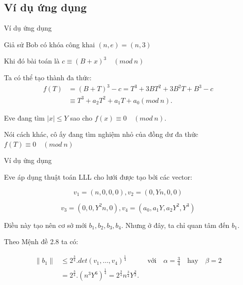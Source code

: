 \documentclass{beamer}
\numberwithin{equation}{section}
\begin{document}
\subsection{Ví dụ ứng dụng}
\begin{frame}{Ví dụ ứng dụng}


Giả sử Bob có khóa công khai $(n, e) = (n, 3)$

Khi đó bài toán là $c \equiv (B+x)^3 \quad (mod \ n)$ 


Ta có thể tạo thành đa thức:
$$
\begin{aligned}
f(T) & = (B+T)^3 - c = T^3 + 3BT^2 + 3B^2T + B^3 -c\\
& \equiv T^3 + a_2T^2 + a_1T + a_0 (mod \ n).
\end{aligned}
$$

Eve đang tìm $|x| \leq Y$ sao cho $f(x) \equiv 0 \quad (mod \ n)$. 

Nói cách khác, cô ấy đang tìm nghiệm nhỏ của đồng dư đa thức $f(T) \equiv 0 \quad (mod \ n)$



 


\end{frame}
\begin{frame}{Ví dụ ứng dụng}

Eve áp dụng thuật toán LLL cho lưới được tạo bởi các vector:



$$v_1 =(n, 0, 0, 0), v_2 = (0, Yn, 0, 0) $$

$$ v_3 = (0, 0, Y^2n, 0), v_4 = (a_0, a_1Y, a_2Y^2, Y^3)$$



Điều này tạo nên cơ sở mới $b_1, b_2, b_3, b_4$. Nhưng ở đây, ta chỉ quan tâm đến $b_1$. 


Theo Mệnh đề 2.8 ta có:



$$
\begin{aligned}
\|b_1\| & \leq 2^{\tfrac{3}{4}}.det(v_1, \dots, v_4)^{\tfrac{1}{4}} \qquad \quad \text{với} \quad \alpha = \frac{3}{4} \quad \text{hay} \quad \beta = 2 \\
& = 2^{\tfrac{3}{4}}.(n^{3}Y^{6})^{\tfrac{1}{4}} = 2^{\tfrac{3}{4}}n^{\tfrac{3}{4}}Y^{\tfrac{3}{2}} \text{.}
\end{aligned}
$$

\end{frame}
\end{document}
